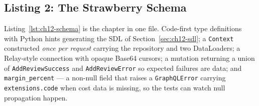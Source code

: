 \subsection{Listing 2: The Strawberry Schema}
\label{subsec:ch12-code-schema}

Listing~\ref{lst:ch12-schema} is the chapter in one file. Code-first type
definitions with Python hints generating the SDL of
Section~\ref{sec:ch12-sdl}; a \texttt{Context} constructed \emph{once per
request} carrying the repository and two DataLoaders; a Relay-style
connection with opaque Base64 cursors; a mutation returning a union of
\texttt{AddReviewSuccess} and \texttt{AddReviewError} so expected failures
are data; and \texttt{margin\_percent} --- a non-null field that raises a
\texttt{GraphQLError} carrying \texttt{extensions.code} when cost data is
missing, so the tests can watch null propagation happen.

